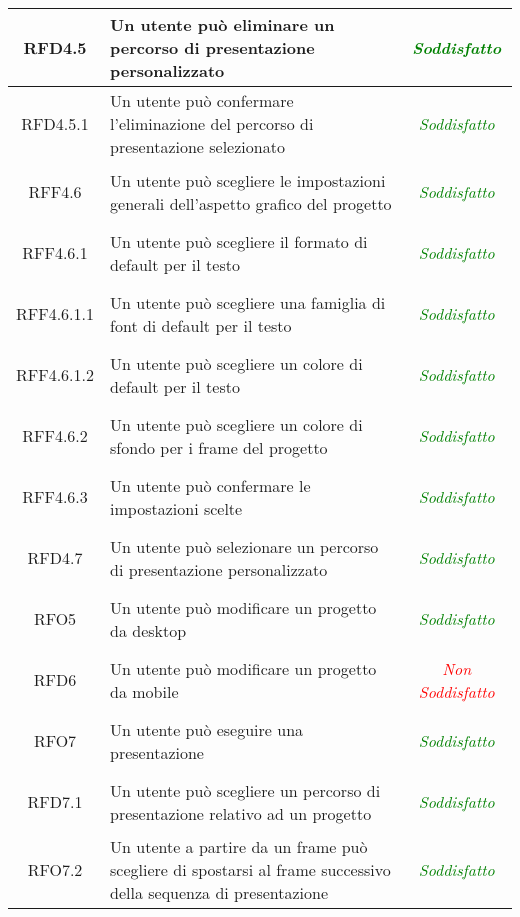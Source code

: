 \begin{longtable}{|c|>{\centering}m{7cm}|c|}
\hypertarget{RFD4.5}{RFD4.5} & Un utente può eliminare un percorso di presentazione personalizzato & \textcolor{Green}{\textit{Soddisfatto}}\\ \hline
\hypertarget{RFD4.5.1}{RFD4.5.1} & Un utente può confermare l'eliminazione del percorso di presentazione selezionato & \textcolor{Green}{\textit{Soddisfatto}}\\ \hline
\hypertarget{RFF4.6}{RFF4.6} & Un utente può scegliere le impostazioni generali dell’aspetto grafico del progetto & \textcolor{Green}{\textit{Soddisfatto}}\\ \hline
\hypertarget{RFF4.6.1}{RFF4.6.1} & Un utente può scegliere il formato di default per il testo & \textcolor{Green}{\textit{Soddisfatto}}\\ \hline
\hypertarget{RFF4.6.1.1}{RFF4.6.1.1} & Un utente può scegliere una famiglia di font di default per il testo & \textcolor{Green}{\textit{Soddisfatto}}\\ \hline
\hypertarget{RFF4.6.1.2}{RFF4.6.1.2} & Un utente può scegliere un colore di default per il testo & \textcolor{Green}{\textit{Soddisfatto}}\\ \hline
\hypertarget{RFF4.6.2}{RFF4.6.2} & Un utente può scegliere un colore di sfondo per i frame del progetto & \textcolor{Green}{\textit{Soddisfatto}}\\ \hline
\hypertarget{RFF4.6.3}{RFF4.6.3} & Un utente può confermare le impostazioni scelte & \textcolor{Green}{\textit{Soddisfatto}}\\ \hline
\hypertarget{RFD4.7}{RFD4.7} & Un utente può selezionare un percorso di presentazione personalizzato & \textcolor{Green}{\textit{Soddisfatto}}\\ \hline
\hypertarget{RFO5}{RFO5} & Un utente può modificare un progetto da desktop & \textcolor{Green}{\textit{Soddisfatto}}\\ \hline
\hypertarget{RFD6}{RFD6} & Un utente può modificare un progetto da mobile & \textcolor{Red}{\textit{Non Soddisfatto}}\\ \hline
\hypertarget{RFO7}{RFO7} & Un utente può eseguire una presentazione & \textcolor{Green}{\textit{Soddisfatto}}\\ \hline
\hypertarget{RFD7.1}{RFD7.1} & Un utente può scegliere un percorso di presentazione relativo ad un progetto & \textcolor{Green}{\textit{Soddisfatto}}\\ \hline
\hypertarget{RFO7.2}{RFO7.2} & Un utente a partire da un frame può scegliere di spostarsi al frame successivo della sequenza di presentazione & \textcolor{Green}{\textit{Soddisfatto}}\\ \hline

\end{longtable}

